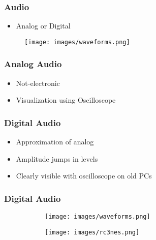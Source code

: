 \documentclass[aspectratio=43]{uva-inf-presentation}
\begin{document}
\begin{frame}
\frametitle{Audio}

\begin{itemize}
\item Analog or Digital
\end{itemize}

\begin{figure}
\texttt{[image: images/waveforms.png]}
\end{figure}

\end{frame}


\begin{frame}
\frametitle{Analog Audio}

\begin{itemize}
\item Not-electronic
\item Visualization using Oscilloscope
\end{itemize}

\end{frame}


\begin{frame}
\frametitle{Digital Audio}

\begin{itemize}
\item Approximation of analog
\item Amplitude jumps in levels
\item Clearly visible with oscilloscope on old PCs
\end{itemize}

\end{frame}


\begin{frame}
\frametitle[fragile]{Digital Audio}

\begin{figure}
	\begin{subfigure}[b]{0.4\textwidth}
		\texttt{[image: images/waveforms.png]}
	\end{subfigure}
	\begin{subfigure}[b]{0.5\textwidth}
		\texttt{[image: images/rc3nes.png]}
	\end{subfigure}
\end{figure}

\end{frame}
\end{document}
